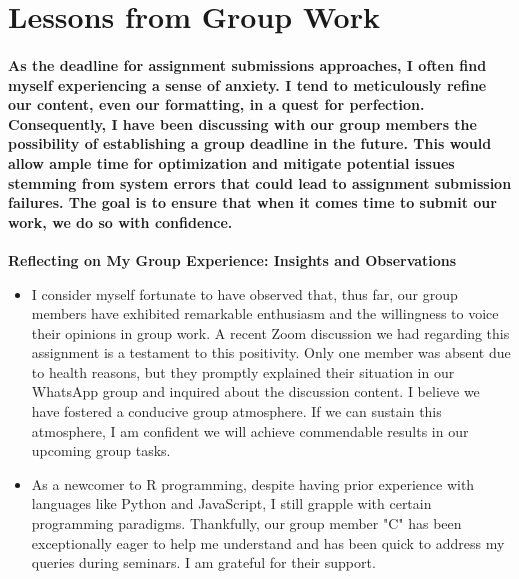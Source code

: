 \documentclass[11pt]{article} %
\begin{document}
\section{Lessons from Group Work}
% 
\paragraph{As the deadline for assignment submissions approaches, I often find myself experiencing a sense of anxiety. I tend to meticulously refine our content, even our formatting, in a quest for perfection. Consequently, I have been discussing with our group members the possibility of establishing a group deadline in the future. This would allow ample time for optimization and mitigate potential issues stemming from system errors that could lead to assignment submission failures. The goal is to ensure that when it comes time to submit our work, we do so with confidence.}
% 
% 
% 
% 
% 
% 
% 
% 
% 
% 
% 
% 
% 
% 
\newpage
\begin{mdframed}[
        backgroundcolor=white,  %
        linecolor=black,        %
        leftmargin=5pt,         %
        rightmargin=5pt,        %
        linewidth=2pt           %
    ]
    \textbf{Reflecting on My Group Experience: Insights and Observations}
    \begin{itemize}
        \item I consider myself fortunate to have observed that, thus far, our group members have exhibited remarkable enthusiasm and the willingness to voice their opinions in group work. A recent Zoom discussion we had regarding this assignment is a testament to this positivity. Only one member was absent due to health reasons, but they promptly explained their situation in our WhatsApp group and inquired about the discussion content. I believe we have fostered a conducive group atmosphere. If we can sustain this atmosphere, I am confident we will achieve commendable results in our upcoming group tasks.
        \item As a newcomer to R programming, despite having prior experience with languages like Python and JavaScript, I still grapple with certain programming paradigms. Thankfully, our group member "C" has been exceptionally eager to help me understand and has been quick to address my queries during seminars. I am grateful for their support.
    \end{itemize}
\end{mdframed}
% 
% 
% 
% 
% 
% 
% 
% 
% 
% 
% 
% 
% 
\end{document}
